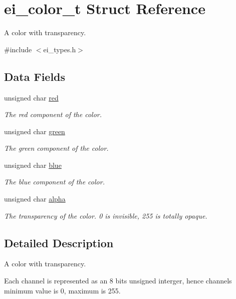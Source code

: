 \hypertarget{structei__color__t}{}\section{ei\+\_\+color\+\_\+t Struct Reference}
\label{structei__color__t}


A color with transparency.  




{\ttfamily \#include $<$ei\+\_\+types.\+h$>$}

\subsection*{Data Fields}
\begin{DoxyCompactItemize}
\item 
unsigned char \hyperlink{structei__color__t_a9adf283c79176b3426ac63784f0bc17b}{red}
\begin{DoxyCompactList}\small\item\em The red component of the color. \end{DoxyCompactList}\item 
unsigned char \hyperlink{structei__color__t_ad85ce262fb9c76fe3c52b4eed19505d1}{green}
\begin{DoxyCompactList}\small\item\em The green component of the color. \end{DoxyCompactList}\item 
unsigned char \hyperlink{structei__color__t_af8d67b7a72cbb586519b55033350fb8c}{blue}
\begin{DoxyCompactList}\small\item\em The blue component of the color. \end{DoxyCompactList}\item 
unsigned char \hyperlink{structei__color__t_af213a14356db920b1a04f5270263ae61}{alpha}
\begin{DoxyCompactList}\small\item\em The transparency of the color. 0 is invisible, 255 is totally opaque. \end{DoxyCompactList}\end{DoxyCompactItemize}


\subsection{Detailed Description}
A color with transparency. 

Each channel is represented as an 8 bits unsigned interger, hence channel\textquotesingle{}s minimum value is 0, maximum is 255. 

